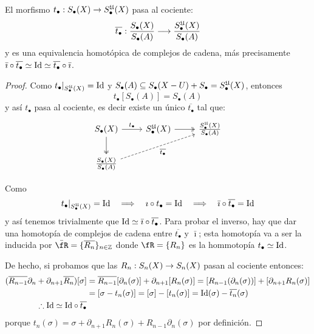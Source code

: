 \begin{ejercicio}\label{ej:74}
  El morfismo $t_{\bullet}:S_{\bullet}(X)\rightarrow S_{\bullet}^{\mathfrak{U}}(X)$ pasa al cociente:
  \[
    \overline{t_{\bullet}}:
    \frac{S_{\bullet}(X)}{S_{\bullet}(A)}\longrightarrow\frac{S_{\bullet}^{\mathfrak{U}}(X)}{S_{\bullet}(A)}
  \]
  y es una equivalencia homot\'opica de complejos de cadena, m\'as precisamente
  $\bar{\imath}\circ\overline{t_{\bullet}}\simeq\text{Id}\simeq \overline{t_{\bullet}}\circ\bar{\imath}$.
\end{ejercicio}
\begin{proof}%
  Como $t_{\bullet}|_{S_{\bullet}^{\mathfrak{U}}(X)}=\text{Id}$ y
  $S_{\bullet}(A)\subseteq S_{\bullet}(X-U)+S_{\bullet}=S_{\bullet}^{\mathfrak{U}}(X)$, entonces
  \[
    t_{\bullet}[S_{\bullet}(A)]=S_{\bullet}(A)
  \]
  y as\'i $t_{\bullet}$ pasa al cociente, es decir existe un \'unico $\overline{t_{\bullet}}$
  tal que:
  \[
    \begin{tikzcd}
      S_{\bullet}(X) \arrow[r,"t_{\bullet}"] \arrow[d,two heads] &
      S_{\bullet}^{\fU}(X) \arrow[r,two heads] & \tfrac{S_{\bullet}^{\fU}(X)}{S_{\bullet}(A)} \\
      \tfrac{S_{\bullet}(X)}{S_{\bullet}(A)} \arrow[urr,dashed ,"\overline{t_{\bullet}}"'] &&
    \end{tikzcd}
  \]

  Como
  \[
    t_{\bullet}|_{S_{\bullet}^{\mathfrak{U}}(X)}=\text{Id} \quad\Longrightarrow\quad
    \imath\circ t_{\bullet}=\text{Id} \quad\Longrightarrow\quad
    \bar{\imath}\circ\overline{t_{\bullet}}=\text{Id}
  \]
  y as\'i tenemos trivialmente que $\text{Id}\simeq\bar{\imath}\circ \overline{t_{\bullet}}$. Para
  probar el inverso, hay que dar una homotop\'ia de complejos de cadena entre $\overline{t_{\bullet}}$ y
  $\bar{\imath}$; esta homotop\'ia va a ser la inducida por $\bar{\fR}=\{\overline{R_n}\}_{n\in\ZZ}$
  donde $\fR=\{R_n\}$ es la hommotop\'ia $t_{\bullet}\simeq\text{Id}$.

  De hecho, si probamos que las $R_n:S_n(X)\rightarrow S_n(X)$ pasan al cociente entonces:
  \begin{align*}
    (\overline{R_{n-1}}\partial_n+\partial_{n+1}\overline{R_n})[\sigma] & =
    \overline{R_{n-1}}[\partial_n(\sigma)]+\partial_{n+1}[R_n(\sigma)]=
    [R_{n-1}(\partial_n(\sigma))]+[\partial_{n+1}R_n(\sigma)]\\ & =
    [\sigma-t_n(\sigma)]=[\sigma]-[t_n(\sigma)]=\text{Id}(\sigma)-\overline{t_n}(\sigma) \\
    \therefore \text{Id} \simeq \text{Id}\circ\overline{t_{\bullet}}
  \end{align*}
  porque $t_{n}(\sigma)=\sigma+\partial_{n+1}R_n(\sigma)+R_{n-1}\partial_n(\sigma)$ por
  definici\'on.
\end{proof}%

